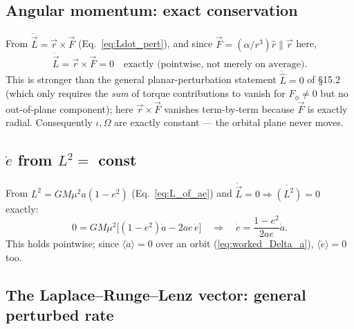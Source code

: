 \documentclass[11pt]{article}
\newcommand{\vecr}{\vec r}
\newcommand{\vecL}{\vec L}
\newcommand{\vecF}{\vec F}
\newcommand{\rhat}{\hat r}
\begin{document}
\subsection{Angular momentum: exact conservation}

From $\dot{\vecL}=\vecr\times\vecF$ (Eq.~\ref{eq:Ldot_pert}), and since $\vecF=(\alpha/r^3)\rhat\parallel\vecr$ here,
\begin{equation}
\dot{\vecL} = \vecr\times\vecF = 0 \quad\text{exactly (pointwise, not merely on average).} \label{eq:worked_Ldot}
\end{equation}
This is stronger than the general planar-perturbation statement $\dot{\hat L}=0$ of \S15.2 (which only requires the \emph{sum} of torque contributions to vanish for $F_\phi\ne0$ but no out-of-plane component); here $\vecr\times\vecF$ vanishes term-by-term because $\vecF$ is exactly radial. Consequently $\iota,\Omega$ are exactly constant — the orbital plane never moves.

\subsection{$\dot e$ from $L^2=$ const}

From $L^2=GM\mu^2a(1-e^2)$ (Eq.~\ref{eq:L_of_ae}) and $\dot{\vecL}=0\Rightarrow \dot{(L^2)}=0$ exactly:
\[
0 = GM\mu^2\Big[(1-e^2)\dot a - 2ae\,\dot e\Big]
\quad\Longrightarrow\quad
\dot e = \frac{1-e^2}{2ae}\dot a. \label{eq:worked_edot}
\]
This holds pointwise; since $\langle\dot a\rangle=0$ over an orbit (\ref{eq:worked_Delta_a}), $\langle\dot e\rangle=0$ too.

\subsection{The Laplace--Runge--Lenz vector: general perturbed rate}
\end{document}
